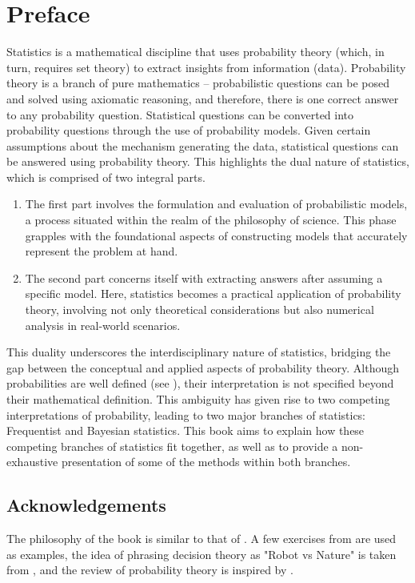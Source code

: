 \chapter{Preface}
\label{chp:preface}
Statistics is a mathematical discipline that uses probability theory (which, in turn, requires set theory) to extract insights from information (data). Probability theory is a branch of pure mathematics -- probabilistic questions can be posed and solved using axiomatic reasoning, and therefore, there is one correct answer to any probability question. Statistical questions can be converted into probability questions through the use of probability models. Given certain assumptions about the mechanism generating the data, statistical questions can be answered using probability theory. This highlights the dual nature of statistics, which is comprised of two integral parts.
\begin{enumerate}
	\item The first part involves the formulation and evaluation of probabilistic models, a process situated within the realm of the philosophy of science. This phase grapples with the foundational aspects of constructing models that accurately represent the problem at hand.
	\item The second part concerns itself with extracting answers after assuming a specific model. Here, statistics becomes a practical application of probability theory, involving not only theoretical considerations but also numerical analysis in real-world scenarios.
\end{enumerate}
This duality underscores the interdisciplinary nature of statistics, bridging the gap between the conceptual and applied aspects of probability theory. Although probabilities are well defined (see ), their interpretation is not specified beyond their mathematical definition. This ambiguity has given rise to two competing interpretations of probability, leading to two major branches of statistics: Frequentist and Bayesian statistics. This book aims to explain how these competing branches of statistics fit together, as well as to provide a non-exhaustive presentation of some of the methods within both branches. 

\section{Acknowledgements}
The philosophy of the book is similar to that of \cite{Sivia2006, murphy2023probabilistic}. A few exercises from \cite{murphy2023probabilistic} are used as examples, the idea of phrasing decision theory as "Robot vs Nature" is taken from \cite{lavalle2006planning}, and the review of probability theory is inspired by \cite{chan2021introduction}.